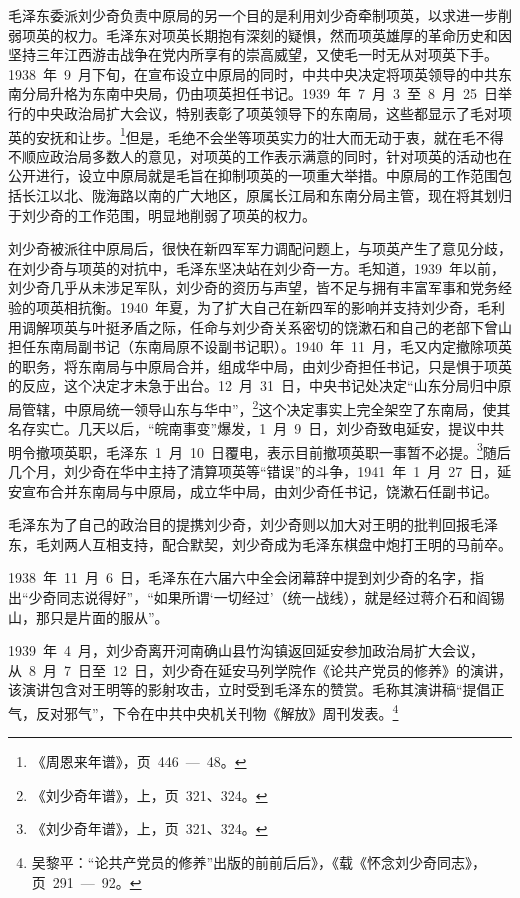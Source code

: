 毛泽东委派刘少奇负责中原局的另一个目的是利用刘少奇牵制项英，以求进一步削弱项英的权力。毛泽东对项英长期抱有深刻的疑惧，然而项英雄厚的革命历史和因坚持三年江西游击战争在党内所享有的崇高威望，又使毛一时无从对项英下手。1938~年~9~月下旬，在宣布设立中原局的同时，中共中央决定将项英领导的中共东南分局升格为东南中央局，仍由项英担任书记。1939~年~7~月~3~至~8~月~25~日举行的中央政治局扩大会议，特别表彰了项英领导下的东南局，这些都显示了毛对项英的安抚和让步。\footnote{《周恩来年谱》，页~446~—~48。}但是，毛绝不会坐等项英实力的壮大而无动于衷，就在毛不得不顺应政治局多数人的意见，对项英的工作表示满意的同时，针对项英的活动也在公开进行，设立中原局就是毛旨在抑制项英的一项重大举措。中原局的工作范围包括长江以北、陇海路以南的广大地区，原属长江局和东南分局主管，现在将其划归于刘少奇的工作范围，明显地削弱了项英的权力。

刘少奇被派往中原局后，很快在新四军军力调配问题上，与项英产生了意见分歧，在刘少奇与项英的对抗中，毛泽东坚决站在刘少奇一方。毛知道，1939~年以前，刘少奇几乎从未涉足军队，刘少奇的资历与声望，皆不足与拥有丰富军事和党务经验的项英相抗衡。1940~年夏，为了扩大自己在新四军的影响并支持刘少奇，毛利用调解项英与叶挺矛盾之际，任命与刘少奇关系密切的饶漱石和自己的老部下曾山担任东南局副书记（东南局原不设副书记职）。1940~年~11~月，毛又内定撤除项英的职务，将东南局与中原局合并，组成华中局，由刘少奇担任书记，只是惧于项英的反应，这个决定才未急于出台。12~月~31~日，中央书记处决定“山东分局归中原局管辖，中原局统一领导山东与华中”，\footnote{《刘少奇年谱》，上，页~321、324。}这个决定事实上完全架空了东南局，使其名存实亡。几天以后，“皖南事变”爆发，1~月~9~日，刘少奇致电延安，提议中共明令撤项英职，毛泽东~1~月~10~日覆电，表示目前撤项英职一事暂不必提。\footnote{《刘少奇年谱》，上，页~321、324。}随后几个月，刘少奇在华中主持了清算项英等“错误”的斗争，1941~年~1~月~27~日，延安宣布合并东南局与中原局，成立华中局，由刘少奇任书记，饶漱石任副书记。

毛泽东为了自己的政治目的提携刘少奇，刘少奇则以加大对王明的批判回报毛泽东，毛刘两人互相支持，配合默契，刘少奇成为毛泽东棋盘中炮打王明的马前卒。

1938~年~11~月~6~日，毛泽东在六届六中全会闭幕辞中提到刘少奇的名字，指出“少奇同志说得好”，“如果所谓‘一切经过’（统一战线），就是经过蒋介石和阎锡山，那只是片面的服从”。

1939~年~4~月，刘少奇离开河南确山县竹沟镇返回延安参加政治局扩大会议，从~8~月~7~日至~12~日，刘少奇在延安马列学院作《论共产党员的修养》的演讲，该演讲包含对王明等的影射攻击，立时受到毛泽东的赞赏。毛称其演讲稿“提倡正气，反对邪气”，下令在中共中央机关刊物《解放》周刊发表。\footnote{吴黎平：“论共产党员的修养”出版的前前后后》，《载《怀念刘少奇同志》，页~291~—~92。}

